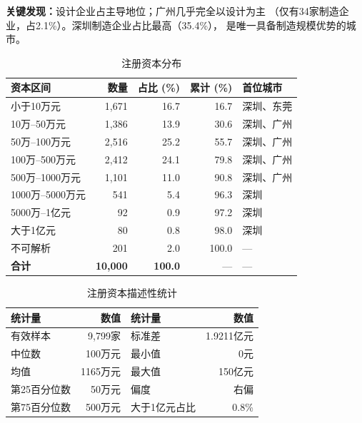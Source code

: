 \documentclass[12pt,a4paper]{article}
\newcommand{\tableHeaderRow}{\rowcolor{tealPrimary}\color{white}}
\newcommand{\tableOddRow}{\rowcolor{mintBG}}
\newcommand{\tableEvenRow}{\rowcolor{white}}
\begin{document}
\textbf{关键发现：}设计企业占主导地位；广州几乎完全以设计为主
（仅有34家制造企业，占2.1\%）。深圳制造企业占比最高（35.4\%），
是唯一具备制造规模优势的城市。

\begin{table}[H]
\centering
\caption{注册资本分布}
\label{tab:capital}
\begin{tabular}{lrrrl}
\toprule
\tableHeaderRow
\textbf{资本区间} & \textbf{数量} & \textbf{占比 (\%)} & \textbf{累计 (\%)} & \textbf{首位城市} \\
\midrule
\tableOddRow  小于10万元         & 1,671 & 16.7 & 16.7 & 深圳、东莞 \\
\tableEvenRow 10万--50万元       & 1,386 & 13.9 & 30.6 & 深圳、广州 \\
\tableOddRow  50万--100万元      & 2,516 & 25.2 & 55.7 & 深圳、广州 \\
\tableEvenRow 100万--500万元     & 2,412 & 24.1 & 79.8 & 深圳、广州 \\
\tableOddRow  500万--1000万元    & 1,101 & 11.0 & 90.8 & 深圳、广州 \\
\tableEvenRow 1000万--5000万元   & 541   & 5.4  & 96.3 & 深圳 \\
\tableOddRow  5000万--1亿元      & 92    & 0.9  & 97.2 & 深圳 \\
\tableEvenRow 大于1亿元          & 80    & 0.8  & 98.0 & 深圳 \\
\tableOddRow  不可解析           & 201   & 2.0  & 100.0 & --- \\
\midrule
\tableEvenRow \textbf{合计}      & \textbf{10,000} & \textbf{100.0} & --- & --- \\
\bottomrule
\end{tabular}
\end{table}

\begin{table}[H]
\centering
\caption{注册资本描述性统计}
\label{tab:capital_stat}
\begin{tabular}{lrlr}
\toprule
\tableHeaderRow
\textbf{统计量} & \textbf{数值} & \textbf{统计量} & \textbf{数值} \\
\midrule
\tableOddRow  有效样本        & 9,799家      & 标准差            & 1.9211亿元 \\
\tableEvenRow 中位数          & 100万元      & 最小值            & 0元 \\
\tableOddRow  均值            & 1165万元     & 最大值            & 150亿元 \\
\tableEvenRow 第25百分位数    & 50万元       & 偏度              & 右偏 \\
\tableOddRow  第75百分位数    & 500万元      & 大于1亿元占比     & 0.8\% \\
\bottomrule
\end{tabular}
\end{table}
\end{document}
